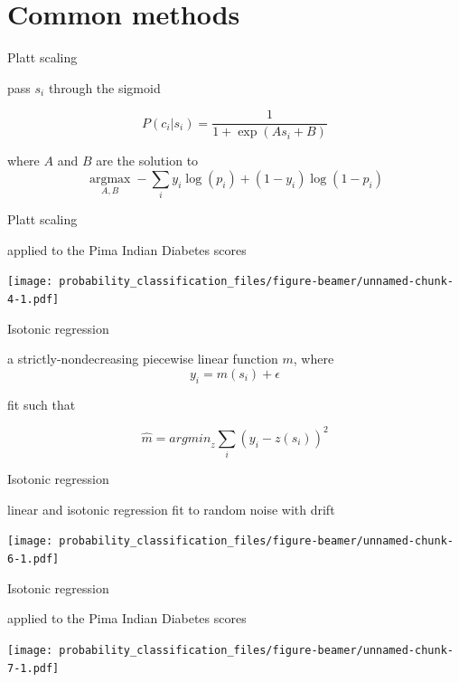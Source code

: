 \documentclass[ignorenonframetext,]{beamer}
\begin{document}
\section{Common methods}\label{common-methods}

\begin{frame}{Platt scaling}

pass \(s_i\) through the sigmoid

\[P(c_i | s_i) = \frac{1}{1 + \exp(As_i + B)}\]

where \(A\) and \(B\) are the solution to
\[\underset{A, B}{\operatorname{argmax}} - \sum\limits_{i} y_i \log(p_i) + (1 - y_i) \log(1- p_i)\]

\end{frame}

\begin{frame}{Platt scaling}

applied to the Pima Indian Diabetes scores

\texttt{[image: probability\_classification\_files/figure-beamer/unnamed-chunk-4-1.pdf]}

\end{frame}

\begin{frame}{Isotonic regression}

a strictly-nondecreasing piecewise linear function \(m\), where
\[y_i = m(s_i) + \epsilon\]

fit such that

\[\hat{m} = {argmin}_z \sum_i{(y_i-z(s_i)) ^2}\]

\end{frame}

\begin{frame}{Isotonic regression}

linear and isotonic regression fit to random noise with drift

\texttt{[image: probability\_classification\_files/figure-beamer/unnamed-chunk-6-1.pdf]}

\end{frame}

\begin{frame}{Isotonic regression}

applied to the Pima Indian Diabetes scores

\texttt{[image: probability\_classification\_files/figure-beamer/unnamed-chunk-7-1.pdf]}

\end{frame}
\end{document}

